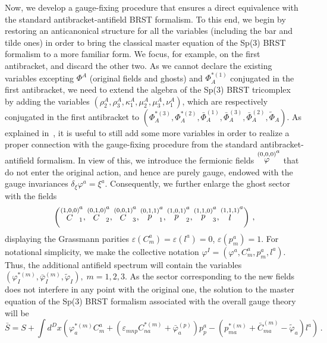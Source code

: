 \documentclass[a4paper,10pt]{article}
\begin{document}
Now, we develop a gauge-fixing procedure that ensures a direct equivalence
with the standard antibracket-antifield BRST formalism. To this end, we
begin by restoring an anticanonical structure for all the variables
(including the bar and tilde ones) in order to bring the classical master
equation of the Sp(3) BRST formalism to a more familiar form. We focus, for
example, on the first antibracket, and discard the other two. As we cannot
declare the existing variables excepting $\Phi ^{A}$ (original fields and
ghosts) and $\Phi _{A}^{*(1)}$ conjugated in the first antibracket, we need
to extend the algebra of the Sp(3) BRST tricomplex~\cite{sp3gen} by adding
the variables $\left( \rho _{2}^{A},\rho _{3}^{A},\kappa _{1}^{A},\mu
_{2}^{A},\mu _{3}^{A},\nu _{1}^{A}\right) $, which are respectively
conjugated in the first antibracket to $\left( \Phi _{A}^{*(3)},\Phi
_{A}^{*(2)},\bar{\Phi}_{A}^{(1)},\bar{\Phi}_{A}^{(3)},\bar{\Phi}_{A}^{(2)},%
\tilde{\Phi}_{A}\right) $. As explained in~\cite{sp3gen}, it is useful to
still add some more variables in order to realize a proper connection with
the gauge-fixing procedure from the standard antibracket-antifield
formalism. In view of this, we introduce the fermionic fields $\stackrel{%
(0,0,0)}{\varphi }^{a}$ that do not enter the original action, and hence are
purely gauge, endowed with the gauge invariances $\delta _{\xi }\varphi
^{a}=\xi ^{a}$. Consequently, we further enlarge the ghost sector with the
fields 
\begin{equation}
\label{sp3.120}
\left( \stackrel{(1,0,0)}{C}_{1}^{a},\stackrel{(0,1,0)}{C}_{2}^{a},\stackrel{%
(0,0,1)}{C}_{3}^{a},\stackrel{(0,1,1)}{p}_{1}^{a},\stackrel{(1,0,1)}{p}%
_{2}^{a},\stackrel{(1,1,0)}{p}_{3}^{a},\stackrel{(1,1,1)}{l}^{a}\right) \,,
\end{equation}
displaying the Grassmann parities $\varepsilon \left( C_{m}^{a}\right)
=\varepsilon \left( l^{a}\right) =0$, $\varepsilon \left( p_{m}^{a}\right)
=1 $. For notational simplicity, we make the collective notation $\varphi
^{I}=\left( \varphi ^{a},C_{m}^{a},p_{m}^{a},l^{a}\right) $. Thus, the
additional antifield spectrum will contain the variables $\left( \varphi
_{I}^{*(m)},\bar{\varphi}_{I}^{(m)},\tilde{\varphi}_{I}\right) ,\;m=1,2,3$.
As the sector corresponding to the new fields does not interfere in any
point with the original one, the solution to the master equation of the
Sp(3) BRST formalism associated with the overall gauge theory will be 
\begin{equation}
\label{sp3.132}
\bar{S}=S+\int d^{D}x\left( \varphi _{a}^{*(m)}C_{m}^{a}+\left( \varepsilon
_{mnp}C_{na}^{*(m)}+\bar{\varphi}_{a}^{(p)}\right) p_{p}^{a}-\left(
p_{ma}^{*(m)}+\bar{C}_{ma}^{(m)}-\tilde{\varphi}_{a}\right) l^{a}\right) \,.
\end{equation}
\end{document}
